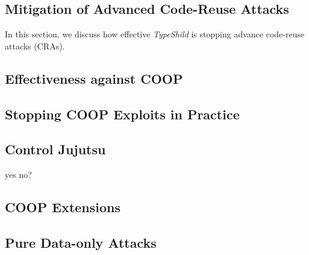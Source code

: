 \subsection{Mitigation of Advanced Code-Reuse Attacks}
\label{Mitigation of Advanced Code-Reuse Attacks}

In this section, we discuss how effective \textit{TypeShild} is 
stopping advance code-reuse attacks (CRAs).

\begin{table}[H]
\centering
\caption{Classification CS}
\label{Integer overflow bug detection in CWE-190}
\end{table}

\subsection{Effectiveness against COOP}
\label{Effectiveness against COOP}

\subsection{Stopping COOP Exploits in Practice}
\label{Stopping COOP Exploits in Practice}

\subsection{Control Jujutsu}
\label{Control Jujutsu}
yes no?


\subsection{COOP Extensions}
\label{COOP Extensions}

\subsection{Pure Data-only Attacks}
\label{Pure Data-only Attacks}


